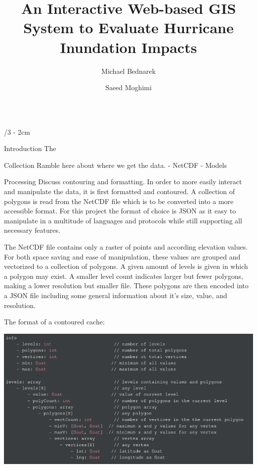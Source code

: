 \documentclass[landscape]{uioposter}
\title{An Interactive Web-based GIS System to Evaluate Hurricane Inundation Impacts}
\author
{%
    Michael Bednarek%
    \and
    Saeed Moghimi%
}
\begin{document}
\begin{frame}
\begin{columns}[onlytextwidth]


\begin{column}{\textwidth/3 - 2cm}
    \begin{block}{Introduction}
        The 
    \end{block}

    \begin{block}{Collection}
        Ramble here about where we get the data.
        - NetCDF
        - Models
    \end{block}
    
    \begin{block}{Processing}
        Discuss contouring and formatting.
        In order to more easily interact and manipulate the data, it is first formatted and contoured. A collection of polygons is read from the NetCDF file which is to be converted into a more accessible format.
        For this project the format of choice is JSON as it easy to manipulate in a multitude of languages and protocols while still supporting all necessary features.
        
        The NetCDF file contains only a raster of points and according elevation values.
        For both space saving and ease of manipulation, these values are grouped and vectorized to a collection of polygons.
        A given amount of levels is given in which a polygon may exist. A smaller level count indicates larger but fewer polygons, making a lower resolution but smaller file.
        These polygons are then encoded into a JSON file including some general information about it's size, value, and resolution.
        
        The format of a contoured cache:
        
        \includegraphics[scale=0.6725]{screenshot1.png}


\end{block}
\end{column}
\end{columns}
\end{frame}
\end{document}
